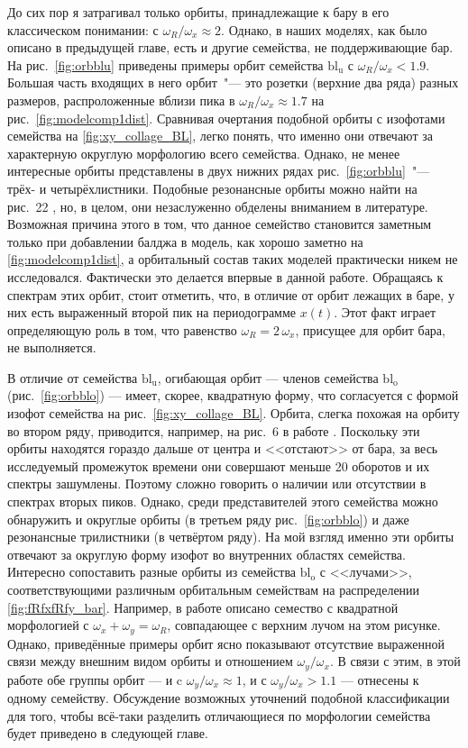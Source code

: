 \documentclass[tikz]{trlnotes}
\begin{document}
До сих пор я затрагивал только орбиты, принадлежащие к бару в его классическом понимании: с $ω_R/ω_x \approx 2$.
Однако, в наших моделях, как было описано в предыдущей главе, есть и другие семейства, не поддерживающие бар.
На рис.~\ref{fig:orbblu} приведены примеры орбит семейства $\text{bl}_{\text{u}}$ с $ω_R/ω_x < 1.9$. Большая часть 
входящих в него орбит~"--- это розетки (верхние два ряда) разных размеров, распроложенные вблизи пика в $ω_R/ω_x \approx 1.7$ на рис.~\ref{fig:modelcomp1dist}.
Сравнивая очертания подобной орбиты с изофотами семейства на \ref{fig:xy_collage_BL}, легко понять, что именно они отвечают
за характерную округлую морфологию всего семейства. Однако, не менее интересные орбиты представлены в двух нижних рядах рис.~\ref{fig:orbblu}~"--- трёх- и четырёхлистники. Подобные резонансные орбиты можно найти на рис.~22 \citet{voglis2007}, но, в целом, они незаслуженно обделены вниманием в литературе.
Возможная причина этого в том, что данное семейство становится заметным только при добавлении балджа в модель, как хорошо
заметно на \ref{fig:modelcomp1dist}, а орбитальный состав таких моделей практически никем не исследовался. Фактически это делается впервые в данной работе. 
Обращаясь к спектрам этих орбит, стоит отметить, что, в отличие от орбит лежащих в баре, у них есть выраженный второй пик на периодограмме $x(t)$. Этот факт играет определяющую роль в том, что  равенство $ω_R = 2\,ω_x$, присущее для орбит бара, не выполняется.

В отличие от семейства $\text{bl}_{\text{u}}$, огибающая орбит --- членов семейства $\text{bl}_{\text{o}}$ (рис.~\ref{fig:orbblo}) --- 
имеет, скорее, квадратную форму, что согласуется с формой изофот семейства на рис.~\ref{fig:xy_collage_BL}. Орбита, слегка похожая на орбиту во втором ряду, приводится, например, на рис.~6 в работе \cite{gajda2016}. Поскольку эти орбиты находятся
гораздо дальше от центра и <<отстают>> от бара, за весь исследуемый промежуток времени они совершают меньше 20 оборотов и их спектры зашумлены. Поэтому сложно говорить о наличии или отсутствии в спектрах вторых пиков. Однако, среди представителей этого семейства можно обнаружить и округлые орбиты (в третьем ряду рис.~\ref{fig:orbblo}) и даже резонансные трилистники (в четвёртом ряду). 
На мой взгляд именно эти орбиты отвечают за округлую форму изофот во внутренних областях семейства. 
Интересно сопоставить разные орбиты из семейства $\text{bl}_\text{o}$ с <<лучами>>, соответствующими различным орбитальным семействам на распределении \ref{fig:fRfxfRfy_bar}. 
Например, в работе \cite{gajda2016} описано семество с квадратной морфологией с $ω_x + ω_y = ω_R$, совпадающее с верхним 
лучом на этом рисунке. Однако, приведённые примеры орбит ясно показывают отсутствие выраженной связи между внешним видом орбиты и отношением $ω_y/ω_x$.
В связи с этим, в этой работе обе группы орбит --- и c $ω_y/ω_x \approx 1$, и с $ω_y/ω_x > 1.1$ --- отнесены к одному семейству. 
Обсуждение возможных уточнений подобной классификации для того, 
чтобы всё-таки разделить отличающиеся по морфологии семейства будет приведено в следующей главе.
\end{document}
